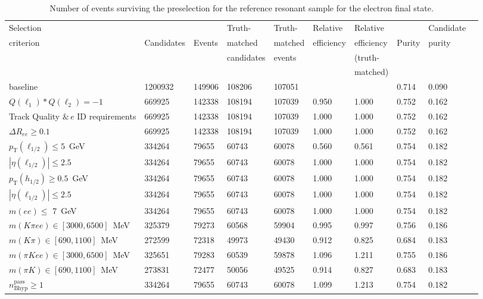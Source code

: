 \begin{table}[ht] 
\caption{Number of events surviving the preselection for the reference resonant sample for the electron final state.} 
\centering 
\hspace*{-1.cm}
{\small
\begin{tabular}{l | l l| l l| l l| l |ll } 
\hline\hline
Selection &             &        & Truth- & Truth- & Relative & Relative &  &  Candidate\\
criterion & Candidates  & Events & matched & matched & efficiency & efficiency & Purity & purity\\
          &             &        & candidates & events &          & (truth- & &\\
          &             &        &   &   &          & matched) & & \\        
\hline
baseline& 1200932& 149906& 108206& 107051&&& 0.714& 0.090\\
$Q(\ell_{1}) * Q(\ell_{2}) = -1$& 669925& 142338& 108194& 107039& 0.950& 1.000& 0.752& 0.162\\
Track Quality $\&\,e$ ID requirements& 669925& 142338& 108194& 107039& 1.000& 1.000& 0.752& 0.162\\
$\Delta R_{ee}\geq  0.1$  & 669925& 142338& 108194& 107039& 1.000& 1.000& 0.752& 0.162\\
$p_{\mathrm{T}}(\ell_{1/2}) \leq 5$~GeV& 334264& 79655& 60743& 60078& 0.560& 0.561& 0.754& 0.182\\
$|\eta(\ell_{1/2})| \leq 2.5$& 334264& 79655& 60743& 60078& 1.000& 1.000& 0.754& 0.182\\
$p_{\mathrm{T}}(h_{1/2}) \geq 0.5$~GeV& 334264& 79655& 60743& 60078& 1.000& 1.000& 0.754& 0.182\\
$|\eta(\ell_{1/2})| \leq 2.5$& 334264& 79655& 60743& 60078& 1.000& 1.000& 0.754& 0.182\\
$m(ee) \leq$ 7~GeV& 334264& 79655& 60743& 60078& 1.000& 1.000& 0.754& 0.182\\
\hline
$m(K\pi ee) \in [3000,6500]$~MeV& 325379& 79273& 60568& 59904& 0.995& 0.997& 0.756& 0.186\\
$m(K\pi) \in [690,1100]$~MeV& 272599& 72318& 49973& 49430& 0.912& 0.825& 0.684& 0.183\\
\hline
$m(\pi Kee) \in [3000,6500]$~MeV& 325651& 79283& 60539& 59878& 1.096& 1.211& 0.755& 0.186\\
$m(\pi K) \in [690,1100]$~MeV& 273831& 72477& 50056& 49525& 0.914& 0.827& 0.683& 0.183\\
\hline
$n_{\mathrm{B hyp}}^{\mathrm{pass}} \geq 1$& 334264& 79655& 60743& 60078& 1.099& 1.213& 0.754& 0.182\\


\end{tabular}}
\end{table}
